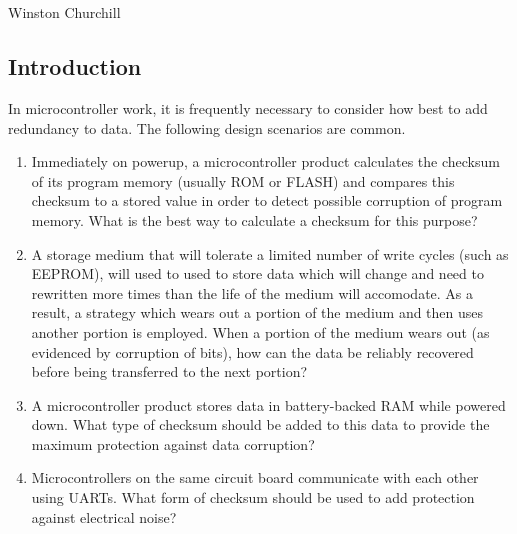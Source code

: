 \chapter[\cedczeroshorttitle{}]{\cedczerolongtitle{}}

\label{cedc0}

                     {Winston Churchill}

\section{Introduction}
\label{cedc0:sint0}

In microcontroller work, it is frequently necessary to consider how
best to add redundancy to data.  The following design scenarios are
common.

\begin{enumerate}
\item Immediately on powerup, a microcontroller product calculates
      the checksum of its program memory (usually ROM or FLASH) and compares this
      checksum to a stored value in order to detect possible corruption of program
      memory.  What is the best way to calculate a checksum for this
      purpose?
\item A storage medium that will tolerate a limited number of write cycles
      (such as EEPROM), will used to used to store data which will change 
      and need to rewritten more times than the life of the medium will
      accomodate.  As a result, a strategy which wears out a portion of the medium
      and then uses another portion is employed.  When a portion of the medium
      wears out (as evidenced by corruption of bits), how can the data be 
      reliably recovered before
      being transferred to the next portion?
\item A microcontroller product stores data in battery-backed RAM while powered
      down.   What type of checksum should be added to this data to provide the maximum
      protection against data corruption?
\item Microcontrollers on the same circuit board communicate with each other
      using UARTs.  What form of checksum should be used to add protection
      against electrical noise?
\end{enumerate}


